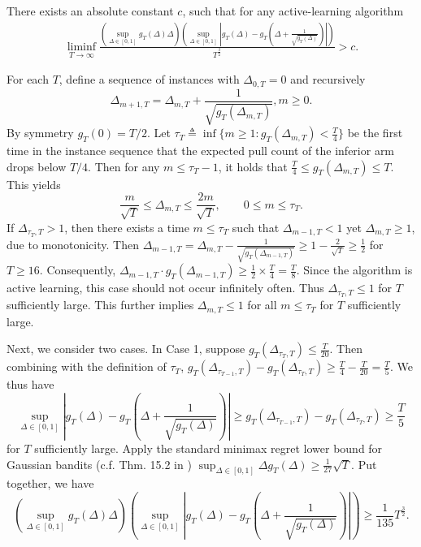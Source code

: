 \documentclass[nonblindrev]{informs3_noinforms}
\begin{document}
\begin{lemma}\label{lem:g_tradeoff0}
There exists an absolute constant $c$, such that for any active-learning algorithm
\begin{align*}   \liminf_{T\rightarrow\infty}\frac{\left(\sup_{\Delta\in[0, 1]}g_T(\Delta)\Delta\right)\left(\sup_{\Delta\in[0, 1]}\left|g_T(\Delta)-g_T\left(\Delta+\frac{1}{\sqrt{g_T(\Delta)}}\right)\right|\right)}{T^{\frac{3}{2}}}>c.
\end{align*}
\end{lemma}
For each $T$, define a sequence of instances with $\Delta_{0, T} = 0$ and recursively 
\[\Delta_{m+1, T} = \Delta_{m, T} + \frac{1}{\sqrt{g_T(\Delta_{m, T})}}, m \ge 0.\]
By symmetry $g_T(0) = T/2.$ Let $\tau_{T} \triangleq \inf\{m \ge 1: g_T(\Delta_{m, T}) < \frac{T}{4}\}$ be the first time in the instance sequence that the expected pull count of the inferior arm drops below $T/4.$ Then for any $m \le \tau_T - 1$, it holds that $\frac{T}{4} \le g_T(\Delta_{m, T}) \le T$. This yields 
\[
\frac{m}{\sqrt{T}} \le \Delta_{m, T} \le \frac{2 m }{\sqrt{T}},  \qquad 0 \le m \le \tau_T.
\]
If $\Delta_{\tau_T, T} > 1$, then there exists a time $m \leq \tau_T$ such that $\Delta_{m-1, T} < 1$ yet $\Delta_{m, T} \ge 1$, due to monotonicity. Then $\Delta_{m-1, T} = \Delta_{m, T} - \frac{1}{\sqrt{g_T(\Delta_{m-1, T})}} \geq 1 - \frac{{2}}{\sqrt{T}} \ge \frac{1}{2}$ for $T \ge {16}$. Consequently, $\Delta_{m-1, T}\cdot g_T\left(\Delta_{m-1, T}\right) \ge \frac{1}{2}\times \frac{T}{4} = \frac{T}{8}$. Since the algorithm is active learning, this case should not occur infinitely often. Thus $\Delta_{\tau_T, T} \le 1$ for $T$ sufficiently large. This further implies $\Delta_{m, T} \le 1$ for all $m \le \tau_T$ for $T$ sufficiently large. 

Next, we consider two cases. In Case 1, suppose $g_T(\Delta_{\tau_T, T}) \le \frac{T}{20}$. Then combining with the definition of $\tau_T$, $g_T(\Delta_{\tau_{T - 1}, T}) - g_T(\Delta_{\tau_T, T}) \ge \frac{T}{4} - \frac{T}{20} = \frac{T}{5}.$ We thus have
\[
\sup_{\Delta \in[0, 1]}
\left|g_T(\Delta)-g_T\left(\Delta+\frac{1}{\sqrt{g_T(\Delta)}}\right)\right| \ge g_T(\Delta_{\tau_{T - 1}, T}) - g_T(\Delta_{\tau_T, T}) \ge \frac{T}{5}
\]
for $T$ sufficiently large.  Apply the standard minimax regret lower bound for Gaussian bandits (c.f. Thm. 15.2 in \cite{lattimore2020bandit}) $\sup_{\Delta\in[0, 1]} \Delta g_T(\Delta) \ge \frac{1}{27}\sqrt{T}$. Put together, we have 
\[
\left(\sup_{\Delta\in[0, 1]}g_T(\Delta)\Delta\right)\left(\sup_{\Delta\in[0, 1]}\left|g_T(\Delta)-g_T\left(\Delta+\frac{1}{\sqrt{g_T(\Delta)}}\right)\right|\right) \ge \frac{1}{135} T^{\frac{3}{2}}.
\]
\end{document}

